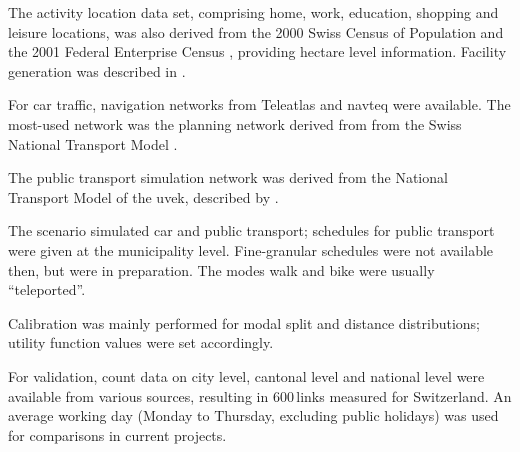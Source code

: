 The activity location data set, comprising home, work, education, shopping and leisure locations, was also derived from the 2000 Swiss Census of Population and the 2001 Federal Enterprise Census \citep[][]{SwissEnterpriseCensus_manual_2001}, providing hectare level information. Facility generation was described in \citet[][p.33]{BalmerEtAl_ResRep_bdktzrh_2009}.

For car traffic, navigation networks from Teleatlas \citep[][]{MultiNet_Webpage_2010} and \gls{navteq} \citep[][]{Navteq_2011} were available. The most-used network was the planning network derived from from the Swiss National Transport Model \citep[][]{VrticEtAl_BiegerEtAl_2003}.

The public transport simulation network was derived from the National Transport Model of the \gls{uvek}, described by \citet[][]{VrticFroehlich_ResRep_UVEK_2010}. 

The scenario simulated car and public transport; schedules for public transport were given at the municipality level. Fine-granular schedules were not available then, but were in preparation. The modes walk and bike were usually ``teleported''. 

Calibration was mainly performed for modal split and distance distributions; utility function values were set accordingly.

For validation, count data on city level, cantonal level and national level \citep[][]{ASTRA_Webpage_2006} were available from various sources, resulting in 600\,links measured for Switzerland. An average working day (Monday to Thursday, excluding public holidays) was used for comparisons in current projects.

